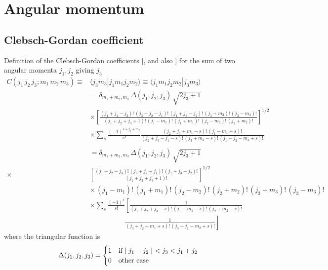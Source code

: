 
\chapter{Angular momentum}
\label{C:angular-momentum}


\section{Clebsch-Gordan coefficient}
\label{S:C-G}

Definition of the Clebsch-Gordan coefficients
[\cite[(B.41)]{Galindo1990_QMvI}, \cite[(3.18,3.19)]{Rose1967_ETO} and also
\cite[(3.6.11)]{Edmonds1960_AMI}] for the sum of two angular momenta $j_{1}, j_{2}$ giving $j_{3}$
%
\begin{align}\label{Q:C-G-definition}
C(j_{1} \, j_{2} \, j_{3}; m_{1} \, m_{2} \, m_{3}) \equiv & \langle j_{3} m_{3}|j_1 m_1 j_2 m_2\rangle  \equiv \langle j_1 m_1 j_2 m_2|j_{3} m_{3}\rangle \nonumber \\ 
&= \delta_{m_{1} +m_{2},m_{3}} \, \Delta(j_{1},j_{2},j_{3}) \, \sqrt{2
j_{3}+1}  \qquad\qquad
\\
&{\times} \left[ \frac{(j_{1}+j_{2}-j_{3})!\,
(j_{3}+j_{2}-j_{1})!\,(j_{1}+j_{3}-j_{2})!\,(j_{3}+m_{3})!\,(j_{3}-
m_{3})! }{(j_{1} +j_{2} + j_{3} +1)! \,(j_{1}- m_{1})! \,(j_{1}+
m_{1})! \,(j_{2}-
m_{2})! \,(j_{2}+ m_{2})!} \right]^{1/2} \nonumber \\
&{\times} \sum_{s} \frac{(-1)^{s + j_{2} + m_{2}}}{s!}\frac{(j_{2} + j_{3} +
m_{1} - s)! \, (j_{1} - m_{1} + s)! \,}{(j_{2} + j_{3} - j_{1} - s)! \,
(j_{3} + m_{3} - s)! \, (j_{1} - j_{2} - m_{3} + s)! \,} \nonumber
\\
\nonumber \\
&= \delta_{m_{1} +m_{2},m_{3}} \, \Delta(j_{1},j_{2},j_{3}) \, \sqrt{2
j_{3}+1} \label{Q:spf1b}
\\
{\times}& \left[ \frac{(j_{1}+j_{2}-j_{3})!\, (j_{3}+j_{2}-j_{1})!\,
(j_{1}+j_{3}-j_{2})!}{(j_{1} +j_{2} + j_{3} +1)!} \right]^{1/2}
\nonumber \\
& {\times}  \,(j_{1}- m_{1})! \,(j_{1}+ m_{1})! \,(j_{2}- m_{2})! \,(j_{2}+
m_{2})! \,(j_{3}+m_{3})!\,(j_{3}- m_{3})! \nonumber
\\
&{\times} \sum_{s} \frac{(-1)^{s}}{s!} \left[ \frac{1}{(j_{1} + j_{2} + j_{3}
- s)! \, (j_{1} - m_{1} - s)! \, (j_{2} + m_{2} - s)! } \right.
\nonumber
\\
& \qquad \qquad \quad \left. \frac{1}{\,(j_{3} + j_{2} + m_{1} + s)!
\, (j_{3} - j_{1} - m_{2} + s)!} \right] \nonumber
\end{align}
%
where the triangular function is
\[
\Delta(j_{1},j_{2},j_{3}) = 
\begin{cases}
1 & \text{if $ \mid j_{1}-j_{2} \mid$ $ < j_{3}<j_{1}+j_{2} $} \\
0 & \text{other case}
\end{cases}
\]

